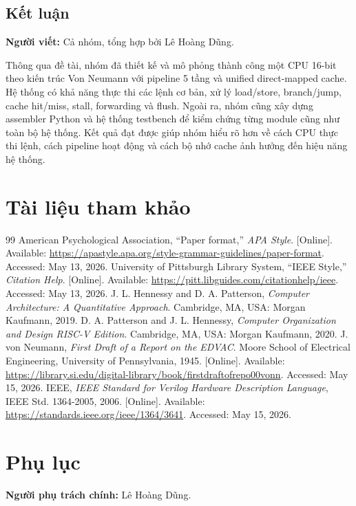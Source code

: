 \documentclass[11pt,a4paper]{article}
\theoremstyle{definition}
\theoremstyle{remark}
\begin{document}
	\subsection{Kết luận}
	\textbf{Người viết:} Cả nhóm, tổng hợp bởi Lê Hoàng Dũng.
	
	Thông qua đề tài, nhóm đã thiết kế và mô phỏng thành công một CPU 16-bit theo kiến trúc Von Neumann với pipeline 5 tầng và unified direct-mapped cache. Hệ thống có khả năng thực thi các lệnh cơ bản, xử lý load/store, branch/jump, cache hit/miss, stall, forwarding và flush. Ngoài ra, nhóm cũng xây dựng assembler Python và hệ thống testbench để kiểm chứng từng module cũng như toàn bộ hệ thống. Kết quả đạt được giúp nhóm hiểu rõ hơn về cách CPU thực thi lệnh, cách pipeline hoạt động và cách bộ nhớ cache ảnh hưởng đến hiệu năng hệ thống.
	
	
	\section{Tài liệu tham khảo}
	\begin{thebibliography}{99}
		 American Psychological Association, ``Paper format,'' \textit{APA Style}. [Online]. Available: \url{https://apastyle.apa.org/style-grammar-guidelines/paper-format}. Accessed: May 13, 2026.
		 University of Pittsburgh Library System, ``IEEE Style,'' \textit{Citation Help}. [Online]. Available: \url{https://pitt.libguides.com/citationhelp/ieee}. Accessed: May 13, 2026.
		 J. L. Hennessy and D. A. Patterson, \textit{Computer Architecture: A Quantitative Approach}. Cambridge, MA, USA: Morgan Kaufmann, 2019.
		 D. A. Patterson and J. L. Hennessy, \textit{Computer Organization and Design RISC-V Edition}. Cambridge, MA, USA: Morgan Kaufmann, 2020.
		 J. von Neumann, \textit{First Draft of a Report on the EDVAC}. Moore School of Electrical Engineering, University of Pennsylvania, 1945. [Online]. Available: \url{https://library.si.edu/digital-library/book/firstdraftofrepo00vonn}. Accessed: May 15, 2026.
		 IEEE, \textit{IEEE Standard for Verilog Hardware Description Language}, IEEE Std. 1364-2005, 2006. [Online]. Available: \url{https://standards.ieee.org/ieee/1364/3641}. Accessed: May 15, 2026.
	\end{thebibliography}
	
	\section{Phụ lục}
	\textbf{Người phụ trách chính:} Lê Hoàng Dũng.
	
\end{document}
